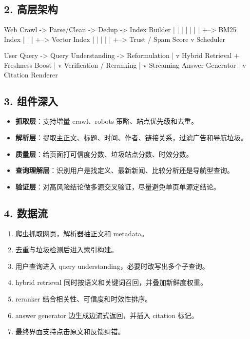 \subsection{2. 高层架构}
\begin{codeblock}
Web Crawl -> Parse/Clean -> Dedup -> Index Builder
    |             |            |          |
    |             |            |          +--> BM25 Index
    |             |            |          +--> Vector Index
    |             |            |
    |             |            +--> Trust / Spam Score
    v
 Scheduler

User Query -> Query Understanding -> Reformulation
                              |
                              v
                  Hybrid Retrieval + Freshness Boost
                              |
                              v
                    Verification / Reranking
                              |
                              v
                   Streaming Answer Generator
                              |
                              v
                      Citation Renderer
\end{codeblock}

\subsection{3. 组件深入}
\begin{itemize}[leftmargin=2em]
\item \textbf{抓取层}：支持增量 crawl、robots 策略、站点优先级和去重。
\item \textbf{解析层}：提取主正文、标题、时间、作者、链接关系，过滤广告和导航垃圾。
\item \textbf{质量层}：给页面打可信度分数、垃圾站点分数、时效分数。
\item \textbf{查询理解层}：识别用户是找定义、最新新闻、比较分析还是导航型查询。
\item \textbf{验证层}：对高风险结论做多源交叉验证，尽量避免单页单源定结论。
\end{itemize}

\subsection{4. 数据流}
\begin{enumerate}[leftmargin=2em]
\item 爬虫抓取网页，解析器抽正文和 metadata。
\item 去重与垃圾检测后进入索引构建。
\item 用户查询进入 query understanding，必要时改写出多个子查询。
\item hybrid retrieval 同时按语义和关键词召回，并叠加新鲜度权重。
\item reranker 结合相关性、可信度和时效性排序。
\item answer generator 边生成边流式返回，并插入 citation 标记。
\item 最终界面支持点击原文和反馈纠错。
\end{enumerate}

